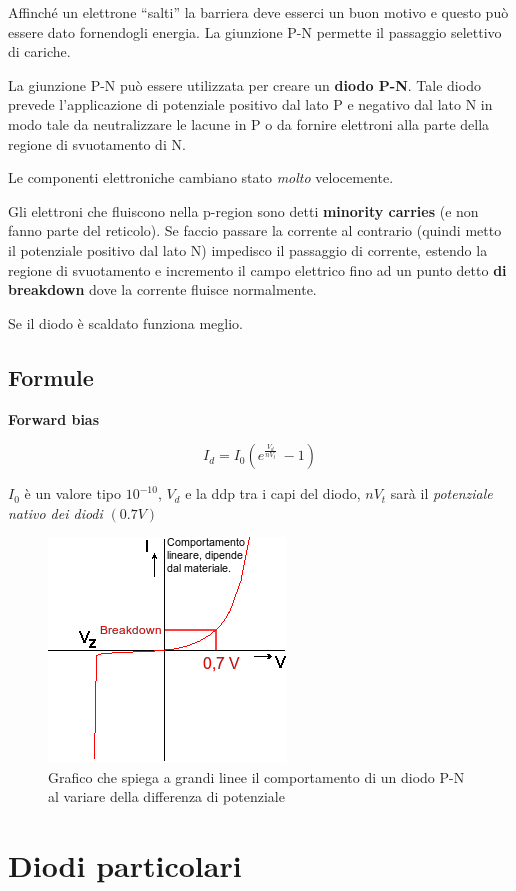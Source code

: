 \documentclass[
]{book}
\begin{document}
Affinché un elettrone ``salti'' la barriera deve esserci un buon motivo
e questo può essere dato fornendogli energia. La giunzione P-N permette
il passaggio selettivo di cariche.

La giunzione P-N può essere utilizzata per creare un \textbf{diodo P-N}.
Tale diodo prevede l'applicazione di potenziale positivo dal lato P e
negativo dal lato N in modo tale da neutralizzare le lacune in P o da
fornire elettroni alla parte della regione di svuotamento di N.

Le componenti elettroniche cambiano stato \emph{molto} velocemente.

Gli elettroni che fluiscono nella p-region sono detti \textbf{minority
carries} (e non fanno parte del reticolo). Se faccio passare la corrente
al contrario (quindi metto il potenziale positivo dal lato N) impedisco
il passaggio di corrente, estendo la regione di svuotamento e incremento
il campo elettrico fino ad un punto detto \textbf{di breakdown} dove la
corrente fluisce normalmente.

Se il diodo è scaldato funziona meglio.

\subsection{Formule}\label{formule}

\textbf{Forward bias}

\[I_{d}=I_{0}(e^{\frac{V_{d}}{nV_{t}}}\ -1)\]

\(I_{0}\) è un valore tipo \(10^{-10}\), \(V_{d}\) e la ddp tra i capi
del diodo, \(nV_{t}\) sarà il \emph{potenziale nativo dei diodi}
\((0.7V)\)

\begin{figure}
\centering
\includegraphics[width=0.3\linewidth,height=\textheight,keepaspectratio]{immagini/3.png}
\caption{Grafico che spiega a grandi linee il comportamento di un diodo
P-N al variare della differenza di potenziale}
\end{figure}

\section{Diodi particolari}\label{diodi-particolari}
\end{document}
